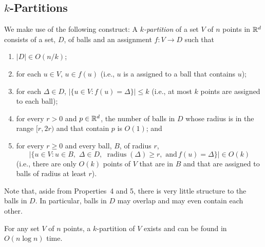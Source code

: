\documentclass{patmorin}
\DeclareMathOperator{\radius}{radius}
\newcommand{\mand}{\mathrm{,\,\,and\,}}
\newcommand{\oand}{\mathrm{,\,\,}}
\begin{document}
\subsection{$k$-Partitions}

We make use of the following construct:  A \emph{$k$-partition} of a
set $V$ of $n$ points in $\mathbb{R}^d$ consists of a set, $D$, of balls and an
assignment $f:V\to D$ such that
\begin{enumerate}
  \item $|D|\in O(n/k)$;
  \item for each $u\in V$, $u\in f(u)$ (i.e., $u$ is a assigned to a
    ball that contains $u$);
  \item for each $\Delta\in D$, $|\{u\in V: f(u)=\Delta\}|\le k$ (i.e.,
   at most $k$ points are assigned to each ball);
  \item for every $r> 0$ and $p\in\mathbb{R}^d$, the number of balls
   in $D$ whose radius is in the range $[r,2r)$ and that contain $p$
   is $O(1)$; and
  \item for every $r\ge 0$ and every ball, $B$, of radius $r$, 
   \[
      |\{ u\in V : u\in B \oand \Delta\in D
        \oand \radius(\Delta)\ge r \mand f(u)=\Delta\}| \in O(k)
   \] 
   (i.e., there are only $O(k)$ points
   of $V$ that are in $B$ and that are assigned to balls of radius at
   least $r$).
\end{enumerate}

Note that, aside from Properties~4 and 5, there is very little structure
to the balls in $D$. In particular, balls in $D$ may overlap and may
even contain each other.

\begin{lem}
  For any set $V$ of $n$ points, a $k$-partition of $V$ exists and can
  be found in $O(n\log n)$ time.
\end{lem}
\end{document}
